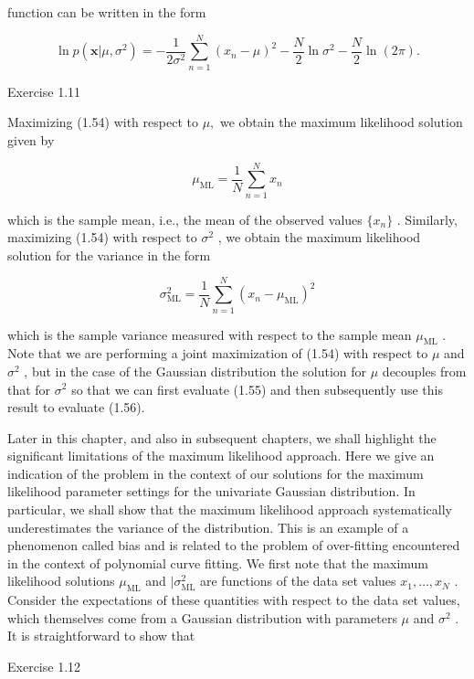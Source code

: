\documentclass[
  10
]{article}
\begin{document}
function can be written in the form

\[
\ln p \left(\mathbf {x} | \mu , \sigma^ {2}\right) = - \frac {1}{2 \sigma^ {2}} \sum_ {n = 1} ^ {N} (x _ {n} - \mu) ^ {2} - \frac {N}{2} \ln \sigma^ {2} - \frac {N}{2} \ln (2 \pi).\tag{1.54}
\]

Exercise 1.11

Maximizing (1.54) with respect to \(\mu ,\) we obtain the maximum
likelihood solution given by

\[
\mu_ {\mathrm{ML}} = \frac {1}{N} \sum_ {n = 1} ^ {N} x _ {n}\tag{1.55}
\]

which is the sample mean, i.e., the mean of the observed values
\(\{ x _ { n } \}\) . Similarly, maximizing (1.54) with respect to
\(\sigma ^ { 2 }\) , we obtain the maximum likelihood solution for the
variance in the form

\[
\sigma_ {\mathrm{ML}} ^ {2} = \frac {1}{N} \sum_ {n = 1} ^ {N} (x _ {n} - \mu_ {\mathrm{ML}}) ^ {2}\tag{1.56}
\]

which is the sample variance measured with respect to the sample mean
\(\mu _ { \mathrm { M L } }\) . Note that we are performing a joint
maximization of (1.54) with respect to \(\mu\) and \(\sigma ^ { 2 }\) ,
but in the case of the Gaussian distribution the solution for \(\mu\)
decouples from that for \(\sigma ^ { 2 }\) so that we can first evaluate
(1.55) and then subsequently use this result to evaluate (1.56).

Later in this chapter, and also in subsequent chapters, we shall
highlight the significant limitations of the maximum likelihood
approach. Here we give an indication of the problem in the context of
our solutions for the maximum likelihood parameter settings for the
univariate Gaussian distribution. In particular, we shall show that the
maximum likelihood approach systematically underestimates the variance
of the distribution. This is an example of a phenomenon called bias and
is related to the problem of over-fitting encountered in the context of
polynomial curve fitting. We first note that the maximum likelihood
solutions \(\mu _ { \mathrm { M L } }\) and
\(\lvert \sigma _ { \mathrm { M L } } ^ { 2 }\) are functions of the
data set values \(x _ { 1 } , \ldots , x _ { N }\) . Consider the
expectations of these quantities with respect to the data set values,
which themselves come from a Gaussian distribution with parameters
\(\mu\) and \(\sigma ^ { 2 }\) . It is straightforward to show that

Exercise 1.12
\end{document}
